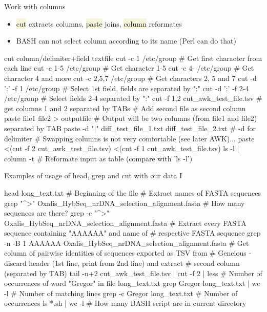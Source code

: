 \documentclass[compress, xelatex, 11pt, xcolor=svgnames, aspectratio=169, url={hyphens, lowtilde}]{beamer}
\renewcommand{\texttt}[1]{\colorbox{Beige}{{\ttfamily #1}}}
\begin{document}
\begin{frame}[fragile]{Work with columns}
	\label{cutpaste}
	\begin{itemize}
		\item \texttt{cut} extracts columns, \texttt{paste} joins, \texttt{column} reformates
		\item BASH can not select column according to its name (Perl can do that)
	\end{itemize}
	\vfill
	\begin{bashcode}
    cut column/delimiter+field textfile
    cut -c 1 /etc/group # Get first character from each line
    cut -c 1-5 /etc/group # Get character 1-5
    cut -c 4- /etc/group # Get character 4 and more
    cut -c 2,5,7 /etc/group # Get characters 2, 5 and 7
    cut -d ':' -f 1 /etc/group # Select 1st field, fields are separated by ":"
    cut -d ':' -f 2-4 /etc/group # Select fields 2-4 separated by ":"
    cut -f 1,2 cut_awk_test_file.tsv # get columns 1 and 2 separated by TABs
    # Add second file as second column
    paste file1 file2 > outputfile
    # Output will be two columns (from file1 and file2) separated by TAB
    paste -d "|" diff_test_file_1.txt diff_test_file_2.txt # -d for delimiter
    # Swapping columns is not very comfortable (see later AWK)...
    paste <(cut -f 2 cut_awk_test_file.tsv) <(cut -f 1 cut_awk_test_file.tsv)
    ls -l | column -t # Reformate input as table (compare with 'ls -l')
	\end{bashcode}
\end{frame}

\begin{frame}[fragile]{Examples of usage of head, grep and cut with our data I}
	\begin{bashcode}
    head long_text.txt # Beginning of the file
    # Extract names of FASTA sequences
    grep "^>" Oxalis_HybSeq_nrDNA_selection_alignment.fasta
    # How many sequences are there?
    grep -c "^>" Oxalis_HybSeq_nrDNA_selection_alignment.fasta
    # Extract every FASTA sequence containing "AAAAAA" and name of
    # respective FASTA sequence
    grep -n -B 1 AAAAAA Oxalis_HybSeq_nrDNA_selection_alignment.fasta
    # Get column of pairwise identities of sequences exported as TSV from
    # Geneious - discard header (1st line, print from 2nd line) and extract
    # second column (separated by TAB)
    tail -n+2 cut_awk_test_file.tsv | cut -f 2 | less
    # Number of occurrences of word "Gregor" in file long_text.txt
    grep Gregor long_text.txt | wc -l # Number of matching lines
    grep -c Gregor long_text.txt # Number of occurrences
    ls *.sh | wc -l # How many BASH script are in current directory
	\end{bashcode}
\end{frame}
\end{document}
